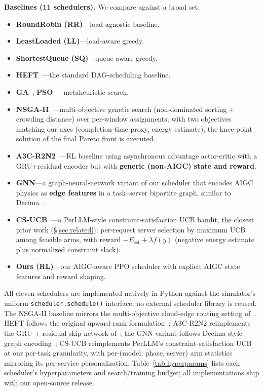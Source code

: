 \textbf{Baselines (11 schedulers).} We compare against a broad
set:
\begin{itemize}
\item \textbf{RoundRobin (RR)}---load-agnostic baseline.
\item \textbf{LeastLoaded (LL)}---load-aware greedy.
\item \textbf{ShortestQueue (SQ)}---queue-aware greedy.
\item \textbf{HEFT}~\cite{topcuoglu2002heft}---the standard
  DAG-scheduling baseline.
\item \textbf{GA}~\cite{holland1975adaptation},
  \textbf{PSO}~\cite{kennedy1995pso}---metaheuristic search.
\item \textbf{NSGA-II}~\cite{yu2025llmrouting}---multi-objective
  genetic search (non-dominated sorting + crowding distance)
  over per-window assignments, with two objectives matching
  our axes (completion-time proxy, energy estimate); the
  knee-point solution of the final Pareto front is executed.
\item \textbf{A3C-R2N2}~\cite{tuli2022a3cr2n}---RL baseline
  using asynchronous advantage actor-critic with a
  GRU+residual encoder but with \textbf{generic (non-AIGC)
  state and reward}.
\item \textbf{GNN}---a graph-neural-network variant of our
  scheduler that encodes AIGC physics as \textbf{edge features}
  in a task--server bipartite graph, similar to
  Decima~\cite{mao2019decima}.
\item \textbf{CS-UCB}~\cite{yang2024perllm}---a PerLLM-style
  constraint-satisfaction UCB bandit, the closest prior work
  (\S\ref{sec:related}): per-request server selection by
  maximum UCB among feasible arms, with reward
  $-E_{\text{est}} + \lambda f(y)$ (negative energy estimate
  plus normalized constraint slack).
\item \textbf{Ours (RL)}---our AIGC-aware PPO scheduler with
  explicit AIGC state features and reward shaping.
\end{itemize}

All eleven schedulers are implemented natively in Python
against
the simulator's uniform \texttt{scheduler.schedule()}
interface; no external scheduler library is reused. The
NSGA-II baseline mirrors the multi-objective cloud-edge
routing setting of~\cite{yu2025llmrouting}. HEFT
follows the original upward-rank
formulation~\cite{topcuoglu2002heft}; A3C-R2N2 reimplements
the GRU + residual-skip network of~\cite{tuli2022a3cr2n}; the
GNN variant follows Decima-style graph
encoding~\cite{mao2019decima}; CS-UCB reimplements PerLLM's
constraint-satisfaction UCB~\cite{yang2024perllm} at our
per-task granularity, with per-(model, phase, server) arm
statistics mirroring its per-service personalization.
Table~\ref{tab:hyperparams}
lists each scheduler's hyperparameters and search/training
budget; all implementations ship with our open-source release.

